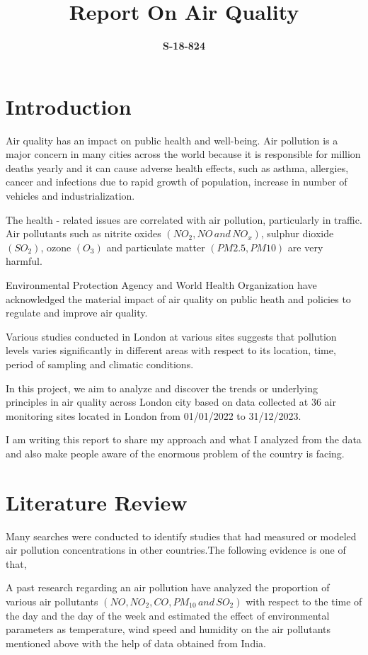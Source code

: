 \documentclass[20pt]{article}
\title{\textbf{Report On Air Quality} }
\author{\textbf{S-18-824}}
\begin{document}
\huge
\maketitle	

\newpage
\large
\tableofcontents

\newpage
\section{Introduction}
\large
\quad Air quality has an impact on public health and well-being. Air pollution is a major concern in many cities across the world because it is responsible for million deaths yearly and it can cause adverse health effects, such as asthma, allergies, cancer and infections due to rapid growth of population, increase in number of vehicles and industrialization.

The health - related issues are correlated with air pollution, particularly 
in traffic. Air pollutants such as nitrite oxides $(NO_2,NO \, and \, NO_x)$, sulphur dioxide $(SO_2)$, ozone $(O_3)$ and particulate matter $(PM2.5,PM10)$ are very harmful.


Environmental Protection Agency and World Health Organization have acknowledged the material impact of air quality on public heath and policies to regulate and improve air quality.


Various studies conducted in London at various sites suggests that pollution levels varies significantly in different areas with respect to its location, time, period of sampling and climatic conditions.

In this project, we aim to analyze and discover the trends or underlying principles in air quality across London city based on data collected at 36 air monitoring sites located in London from 01/01/2022 to 31/12/2023.

I am writing this report to share my approach and what I analyzed from the data and also make people aware of the enormous problem of the country is facing.



\newpage
\section{Literature Review} 
\large
\quad Many searches were conducted to identify studies that had measured 
or modeled air pollution concentrations in other countries.The following evidence is one of that,

A past research regarding  an air pollution have analyzed the proportion of various air pollutants $(NO,NO_2,CO,PM_{10} \, and \,SO_2)$ with respect to the time of the day and the day of the week and estimated the effect of environmental parameters as temperature, wind speed and humidity on the air pollutants mentioned above with the help of data obtained from India.
\end{document}
